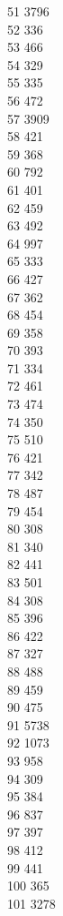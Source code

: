 { 51	3796 \\
 52	336 \\
 53	466 \\
 54	329 \\
 55	335 \\
 56	472 \\
 57	3909 \\
 58	421 \\
 59	368 \\
 60	792 \\
 61	401 \\
 62	459 \\
 63	492 \\
 64	997 \\
 65	333 \\
 66	427 \\
 67	362 \\
 68	454 \\
 69	358 \\
 70	393 \\
 71	334 \\
 72	461 \\
 73	474 \\
 74	350 \\
 75	510 \\
 76	421 \\
 77	342 \\
 78	487 \\
 79	454 \\
 80	308 \\
 81	340 \\
 82	441 \\
 83	501 \\
 84	308 \\
 85	396 \\
 86	422 \\
 87	327 \\
 88	488 \\
 89	459 \\
 90	475 \\
 91	5738 \\
 92	1073 \\
 93	958 \\
 94	309 \\
 95	384 \\
 96	837 \\
 97	397 \\
 98	412 \\
 99	441 \\
 100	365 \\
 101	3278 \\
}
